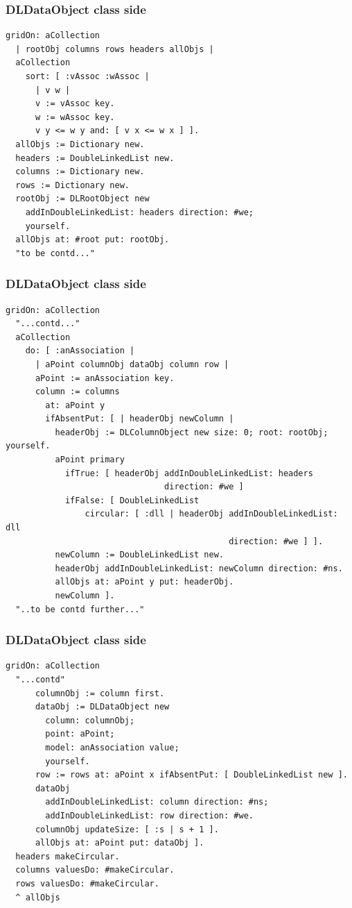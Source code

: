 \documentclass[10pt]{beamer}
\begin{document}
\begin{frame}[fragile]
\frametitle{DLDataObject class side}
\begin{verbatim}
gridOn: aCollection
  | rootObj columns rows headers allObjs |
  aCollection
    sort: [ :vAssoc :wAssoc | 
      | v w |
      v := vAssoc key.
      w := wAssoc key.
      v y <= w y and: [ v x <= w x ] ].
  allObjs := Dictionary new.
  headers := DoubleLinkedList new.
  columns := Dictionary new.
  rows := Dictionary new.
  rootObj := DLRootObject new
    addInDoubleLinkedList: headers direction: #we;
    yourself.
  allObjs at: #root put: rootObj.
  "to be contd..."
\end{verbatim}
\end{frame}

\begin{frame}[fragile]
\frametitle{DLDataObject class side}
\begin{verbatim}
gridOn: aCollection
  "...contd..."
  aCollection
    do: [ :anAssociation | 
      | aPoint columnObj dataObj column row |
      aPoint := anAssociation key.
      column := columns
        at: aPoint y
        ifAbsentPut: [ | headerObj newColumn |
          headerObj := DLColumnObject new size: 0; root: rootObj; yourself.
          aPoint primary
            ifTrue: [ headerObj addInDoubleLinkedList: headers 
                                direction: #we ]
            ifFalse: [ DoubleLinkedList
                circular: [ :dll | headerObj addInDoubleLinkedList: dll 
                                             direction: #we ] ].
          newColumn := DoubleLinkedList new.
          headerObj addInDoubleLinkedList: newColumn direction: #ns.
          allObjs at: aPoint y put: headerObj.
          newColumn ].
  "..to be contd further..."
\end{verbatim}
\end{frame}

\begin{frame}[fragile]
\frametitle{DLDataObject class side}
\begin{verbatim}
gridOn: aCollection
  "...contd"
      columnObj := column first.
      dataObj := DLDataObject new
        column: columnObj;
        point: aPoint;
        model: anAssociation value;
        yourself.
      row := rows at: aPoint x ifAbsentPut: [ DoubleLinkedList new ].
      dataObj
        addInDoubleLinkedList: column direction: #ns;
        addInDoubleLinkedList: row direction: #we.
      columnObj updateSize: [ :s | s + 1 ].
      allObjs at: aPoint put: dataObj ].
  headers makeCircular.
  columns valuesDo: #makeCircular.
  rows valuesDo: #makeCircular.
  ^ allObjs
\end{verbatim}
\end{frame}
\end{document}
